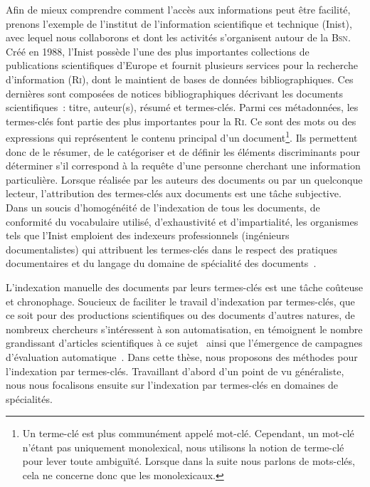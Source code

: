     Afin de mieux comprendre comment l'accès aux informations peut être
    facilité, prenons l'exemple de l'institut de l'information scientifique et
    technique (Inist), avec lequel nous collaborons et dont les activités
    s'organisent autour de la \textsc{Bsn}. Créé en 1988, l'Inist possède l'une
    des plus importantes collections de publications scientifiques d'Europe et
    fournit plusieurs services pour la recherche d'information (\textsc{Ri}),
    dont le maintient de bases de données bibliographiques. Ces dernières sont
    composées de notices bibliographiques décrivant les documents
    scientifiques~: titre, auteur(s), résumé et termes-clés. Parmi ces
    métadonnées, les termes-clés font partie des plus importantes pour la
    \textsc{Ri}. Ce sont des mots ou des expressions qui représentent le contenu
    principal d'un document\footnote{Un terme-clé est plus communément appelé
    mot-clé. Cependant, un mot-clé n'étant pas uniquement monolexical, nous
    utilisons la notion de terme-clé pour lever toute ambiguïté. Lorsque dans la
    suite nous parlons de mots-clés, cela ne concerne donc que les
    monolexicaux.}. Ils permettent donc de le résumer, de le catégoriser et de
    définir les éléments discriminants pour déterminer s'il correspond à la
    requête d'une personne cherchant une information particulière. Lorsque
    réalisée par les auteurs des documents ou par un quelconque lecteur,
    l'attribution des termes-clés aux documents est une tâche subjective. Dans
    un soucis d'homogénéité de l'indexation de tous les documents, de conformité
    du vocabulaire utilisé, d'exhaustivité et d'impartialité, les organismes
    tels que l'Inist emploient des indexeurs professionnels (ingénieurs
    documentalistes) qui attribuent les termes-clés dans le respect des
    pratiques documentaires et du langage du domaine de spécialité des
    documents~\cite{guinchat1996techniquesdocumentaires}.

    L'indexation manuelle des documents par leurs termes-clés est une tâche
    coûteuse et chronophage. Soucieux de faciliter le travail d'indexation par
    termes-clés, que ce soit pour des productions scientifiques ou des documents
    d'autres natures, de nombreux chercheurs s'intéressent à son automatisation,
    en témoignent le nombre grandissant d'articles scientifiques à ce
    sujet~\cite{hasan2014state_of_the_art} ainsi que l'émergence de campagnes
    d'évaluation automatique~\cite{kim2010semeval,paroubek2012deft}. Dans cette
    thèse, nous proposons des méthodes pour l'indexation par termes-clés.
    Travaillant d'abord d'un point de vu généraliste, nous nous focalisons
    ensuite sur l'indexation par termes-clés en domaines de spécialités.

